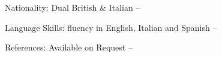 

\begin{cvhonors}

  \cvhonor
    {Nationality:} %
    {Dual British \& Italian} %
    {} %
    {--} %
    
  \cvhonor
    {Language Skills:} %
    {fluency in English, Italian and Spanish} %
    {} %
    {--} %
    
  \cvhonor
    {References:} %
    {Available on Request} %
    {} %
    {--} %
\end{cvhonors}
